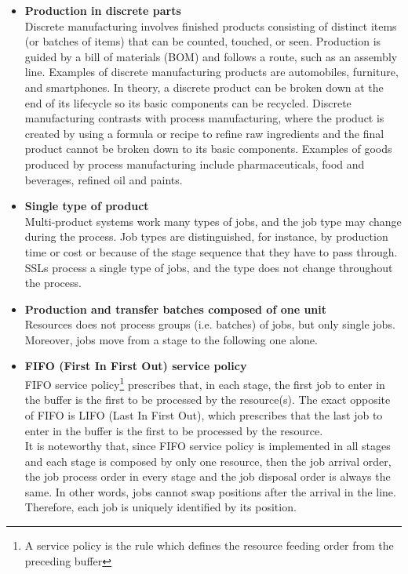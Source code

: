 \begin{itemize}
\item \textbf{Production in discrete parts}\\
Discrete manufacturing involves finished products consisting of distinct items (or batches of items) that can be counted, touched, or seen. Production is guided by a bill of materials (BOM) and follows a route, such as an assembly line. Examples of discrete manufacturing products are automobiles, furniture, and smartphones. In theory, a discrete product can be broken down at the end of its lifecycle so its basic components can be recycled.
Discrete manufacturing contrasts with process manufacturing, where the product is created by using a formula or recipe to refine raw ingredients and the final product cannot be broken down to its basic components. Examples of goods produced by process manufacturing include pharmaceuticals, food and beverages, refined oil and paints.
\item \textbf{Single type of product}\\
Multi-product systems work many types of jobs, and the job type may change during the process. Job types are distinguished, for instance, by production time or cost or because of the stage sequence that they have to pass through. SSLs process a single type of jobs, and the type does not change throughout the process.
\item \textbf{Production and transfer batches composed of one unit}\\
Resources does not process groups (i.e. batches) of jobs, but only single jobs. Moreover, jobs move from a stage to the following one alone.
\item \textbf{FIFO (First In First Out) service policy}\\
FIFO service policy\footnote{A service policy is the rule which defines the resource feeding order from the preceding buffer} prescribes that, in each stage, the first job to enter in the buffer is the first to be processed by the resource(s). The exact opposite of FIFO is LIFO (Last In First Out), which prescribes that the last job to enter in the buffer is the first to be processed by the resource. \\ It is noteworthy that, since FIFO service policy is implemented in all stages and each stage is composed by only one resource, then the job arrival order, the job process order in every stage and the job disposal order is always the same. In other words, jobs cannot swap positions after the arrival in the line. Therefore, each job is uniquely identified by its position.

\end{itemize}
